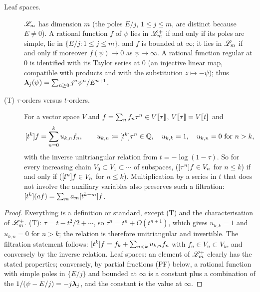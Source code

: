 \begin{lem}
\begin{description}
\item[Leaf spaces.] $\mathscr{L}_m$ has dimension $m$ (the poles $E/j$, $1\leq j\leq m$, are distinct because $E\neq0$). A rational function $f$ of $\psi$ lies in $\mathscr{L}_m^+$ if and only if its poles are simple, lie in $\{E/j:1\leq j\leq m\}$, and $f$ is bounded at $\infty$; it lies in $\mathscr{L}_m$ if and only if moreover $f(\psi)\to0$ as $\psi\to\infty$. A rational function regular at $0$ is identified with its Taylor series at $0$ (an injective linear map, compatible with products and with the substitution $z\mapsto-\psi$); thus $\boldsymbol{\lambda}_j(\psi)=\sum_{n\geq0}j^n\psi^n/E^{n+1}$.
\item[(T) $\tau$-orders versus $t$-orders.] For a vector space $V$ and $f=\sum_nf_n\tau^n\in V[\![ \tau ]\!]$, $V[\![ \tau ]\!]=V[\![ t ]\!]$ and
\[
\coef{t^k}f=\sum_{n=0}^{k}u_{k,n}f_n,\qquad u_{k,n}\coloneqq\coef{t^k}\tau^n\in\bbQ,\quad u_{k,k}=1,\quad u_{k,n}=0\ \text{for }n>k,
\]
with the inverse unitriangular relation from $t=-\log(1-\tau)$. So for every increasing chain $V_0\subset V_1\subset\cdots$ of subspaces, ($[\tau^n]f\in V_n$ for $n\leq k$) if and only if ($[t^n]f\in V_n$ for $n\leq k$). Multiplication by a series in $t$ that does not involve the auxiliary variables also preserves such a filtration: $[t^k](af)=\sum_ma_m[t^{k-m}]f$.
\end{description}
\end{lem}

\begin{proof}
Everything is a definition or standard, except (T) and the characterisation of $\mathscr{L}_m^+$. (T): $\tau=t-t^2/2+\cdots$, so $\tau^n=t^n+O(t^{n+1})$, which gives $u_{k,k}=1$ and $u_{k,n}=0$ for $n>k$; the relation is therefore unitriangular and invertible. The filtration statement follows: $[t^k]f=f_k+\sum_{n<k}u_{k,n}f_n$ with $f_n\in V_n\subset V_k$, and conversely by the inverse relation. Leaf spaces: an element of $\mathscr{L}_m^+$ clearly has the stated properties; conversely, by partial fractions (PF) below, a rational function with simple poles in $\{E/j\}$ and bounded at $\infty$ is a constant plus a combination of the $1/(\psi-E/j)=-j\boldsymbol{\lambda}_j$, and the constant is the value at $\infty$.
\end{proof}

